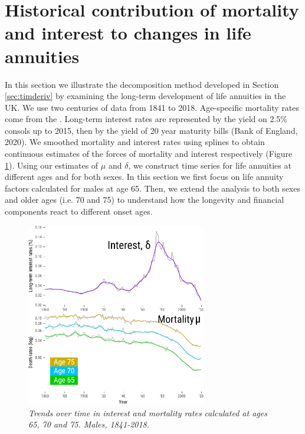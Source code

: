 \documentclass[12pt]{article}
\begin{document}
\section{Historical contribution of mortality and interest to changes in life annuities}



In this section we illustrate the decomposition method developed in Section \ref{sec:timderiv} by examining the long-term development of life annuities in the UK. We use two centuries of data from 1841 to 2018. Age-specific mortality rates come from the \citep{HMD2020}. Long-term interest rates are represented by the yield on 2.5\% consols up to 2015, then by the yield of 20 year maturity bills (Bank of England, 2020). We smoothed mortality and interest rates using splines \citep{green1993nonparametric,camarda2012mortalitysmooth} to obtain continuous estimates of the forces of mortality and interest respectively (Figure \ref{fig:Fig1}). Using our estimates of $\mu$ and $\delta$, we construct time series for life annuities at different ages and for both sexes. In this section we first focus on life annuity factors calculated for males at age 65. Then, we extend the analysis to both sexes and older ages (i.e. 70 and 75) to understand how the longevity and financial components react to different onset ages.

\begin{figure}[!ht]
	\centering
	\includegraphics[width=0.7\textwidth]{Fig/Fig1}
	\caption{\textit{Trends over time in interest and mortality rates calculated at ages 65, 70 and 75. Males, 1841-2018.}}
	\label{fig:Fig1}
\end{figure}
\end{document}
